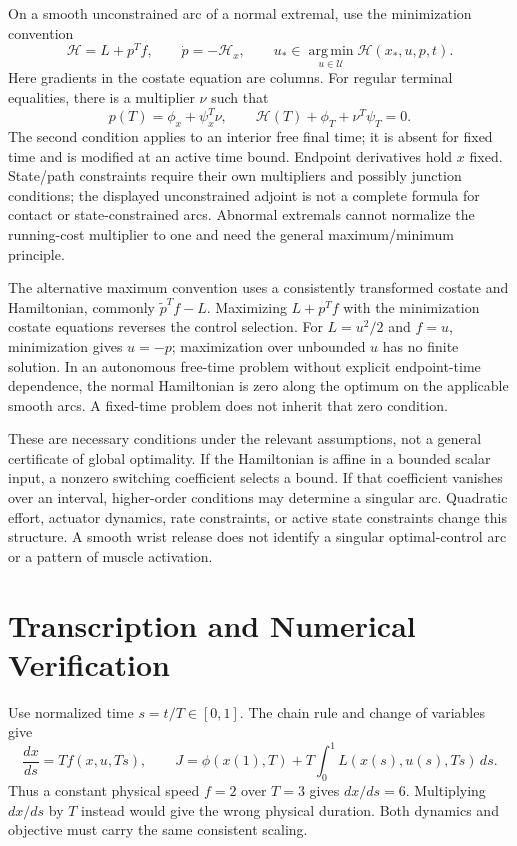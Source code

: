 \documentclass[12pt, openany]{book}
\theoremstyle{plain}
\begin{document}
On a smooth unconstrained arc of a normal extremal, use the minimization
convention
\begin{equation}\label{eq:ocp_hamiltonian}
 \mathcal H=L+p^Tf,\qquad
 \dot p=-\mathcal H_x,\qquad
 u_*\in\operatorname*{arg\,min}_{u\in\mathcal U}\mathcal H(x_*,u,p,t).
\end{equation}
Here gradients in the costate equation are columns. For regular terminal
equalities, there is a multiplier $\nu$ such that
\begin{equation}\label{eq:ocp_transversality}
 p(T)=\phi_x+\psi_x^T\nu,\qquad
 \mathcal H(T)+\phi_T+\nu^T\psi_T=0.
\end{equation}
The second condition applies to an interior free final time; it is absent
for fixed time and is modified at an active time bound. Endpoint derivatives
hold $x$ fixed. State/path constraints require their own multipliers and
possibly junction conditions; the displayed unconstrained adjoint is not a
complete formula for contact or state-constrained arcs. Abnormal extremals
cannot normalize the running-cost multiplier to one and need the general
maximum/minimum principle.

The alternative maximum convention uses a consistently transformed costate
and Hamiltonian, commonly $\tilde p^Tf-L$. Maximizing $L+p^Tf$ with the
minimization costate equations reverses the control selection. For
$L=u^2/2$ and $f=u$, minimization gives $u=-p$; maximization over unbounded
$u$ has no finite solution. In an autonomous free-time problem without
explicit endpoint-time dependence, the normal Hamiltonian is zero along
the optimum on the applicable smooth arcs. A fixed-time problem does not
inherit that zero condition.

These are necessary conditions under the relevant assumptions, not a general
certificate of global optimality. If the Hamiltonian is affine in a bounded
scalar input, a nonzero switching coefficient selects a bound. If that
coefficient vanishes over an interval, higher-order conditions may determine
a singular arc. Quadratic effort, actuator dynamics, rate constraints, or
active state constraints change this structure. A smooth wrist release does
not identify a singular optimal-control arc or a pattern of muscle activation.

\section{Transcription and Numerical Verification}

Use normalized time $s=t/T\in[0,1]$. The chain rule and change of variables give
\begin{equation}\label{eq:normalized_ocp}
 \frac{dx}{ds}=T f(x,u,Ts),\qquad
 J=\phi(x(1),T)+T\int_0^1 L(x(s),u(s),Ts)\,ds.
\end{equation}
Thus a constant physical speed $f=2$ over $T=3$ gives $dx/ds=6$.
Multiplying $dx/ds$ by $T$ instead would give the wrong physical duration.
Both dynamics and objective must carry the same consistent scaling.
\end{document}
